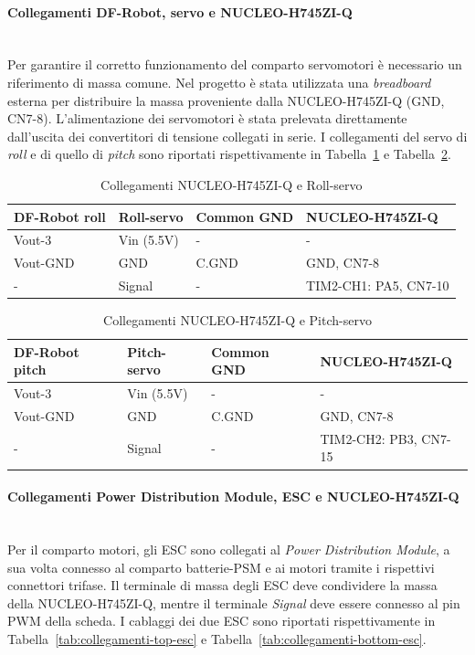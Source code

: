 \documentclass[11pt]{report}
\begin{document}
	\paragraph{Collegamenti DF-Robot, servo e NUCLEO-H745ZI-Q}\mbox{}\\
	Per garantire il corretto funzionamento del comparto servomotori è necessario un riferimento di massa comune. Nel progetto è stata utilizzata una \textit{breadboard} esterna per distribuire la massa proveniente dalla NUCLEO-H745ZI-Q (GND, CN7-8). L'alimentazione dei servomotori è stata prelevata direttamente dall'uscita dei convertitori di tensione collegati in serie. I collegamenti del servo di \textit{roll} e di quello di \textit{pitch} sono riportati rispettivamente in Tabella~\ref{tab:collegamenti-roll-servo} e Tabella~\ref{tab:collegamenti-pitch-servo}.
	
	\begin{table}[H]
		\centering
		\begin{tabular}{l l l l}
			\toprule
			\textbf{DF-Robot roll} & \textbf{Roll-servo} & \textbf{Common GND} & \textbf{NUCLEO-H745ZI-Q} \\
			\midrule
			Vout-3 & Vin (5.5V) & - & - \\
			Vout-GND & GND & C.GND & GND, CN7-8 \\
			- & Signal & - & TIM2-CH1: PA5, CN7-10 \\
			\bottomrule
		\end{tabular}
		\caption{Collegamenti NUCLEO-H745ZI-Q e Roll-servo}
		\label{tab:collegamenti-roll-servo}
	\end{table}
	
	\begin{table}[H]
		\centering
		\begin{tabular}{l l l l}
			\toprule
			\textbf{DF-Robot pitch} & \textbf{Pitch-servo} & \textbf{Common GND} & \textbf{NUCLEO-H745ZI-Q} \\
			\midrule
			Vout-3 & Vin (5.5V) & - & - \\
			Vout-GND & GND & C.GND & GND, CN7-8 \\
			- & Signal & - & TIM2-CH2: PB3, CN7-15 \\
			\bottomrule
		\end{tabular}
		\caption{Collegamenti NUCLEO-H745ZI-Q e Pitch-servo}
		\label{tab:collegamenti-pitch-servo}
	\end{table}
	
	\paragraph{Collegamenti Power Distribution Module, ESC e NUCLEO-H745ZI-Q}\mbox{}\\
	Per il comparto motori, gli ESC sono collegati al \textit{Power Distribution Module}, a sua volta connesso al comparto batterie-PSM e ai motori tramite i rispettivi connettori trifase. Il terminale di massa degli ESC deve condividere la massa della NUCLEO-H745ZI-Q, mentre il terminale \textit{Signal} deve essere connesso al pin PWM della scheda. I cablaggi dei due ESC sono riportati rispettivamente in Tabella~\ref{tab:collegamenti-top-esc} e Tabella~\ref{tab:collegamenti-bottom-esc}.
	
\end{document}
